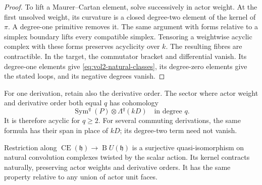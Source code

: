 \begin{proof}
To lift a Maurer--Cartan element, solve successively in actor
weight. At the first unsolved weight, its curvature is a closed
degree-two element of the kernel of $\pi$. A degree-one primitive
removes it. The same argument with forms relative to a simplex
boundary lifts every compatible simplex. Tensoring a weightwise
acyclic complex with these forms preserves acyclicity over $k$.
The resulting fibres are contractible. In the target, the
commutator bracket and differential vanish. Its degree-one
elements give \eqref{eq:vol2-natural-classes}, its degree-zero
elements give the stated loops, and its negative degrees vanish.
\end{proof}

For one derivation, retain also the derivative order. The sector
where actor weight and derivative order both equal $q$ has
cohomology
\[
 \operatorname{Sym}^q(P)\otimes\Lambda^q(kD)
 \quad\text{in degree }q.
\]
It is therefore acyclic for $q\geq2$. For several commuting
derivations, the same formula has their span in place of $kD$;
its degree-two term need not vanish.

\begin{lemma}\label{lem:vol2-natural-bar-lifting}
Restriction along
$\operatorname{CE}(\mathfrak h)\to\operatorname B U(\mathfrak h)$
is a surjective quasi-isomorphism on natural convolution complexes
twisted by the scalar action. Its kernel contracts naturally,
preserving actor weights and derivative orders. It has the same
property relative to any union of actor unit faces.
\end{lemma}

